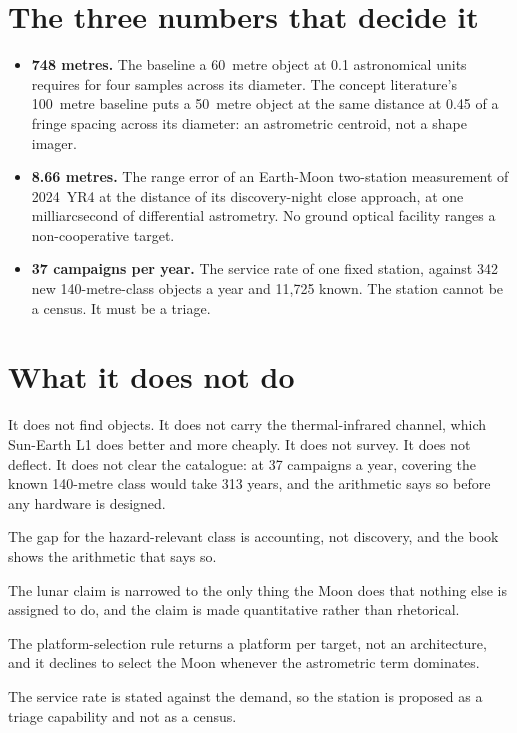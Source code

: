 \section*{The three numbers that decide it}

\begin{itemize}
\item \textbf{748 metres.} The baseline a 60~metre object at 0.1 astronomical
units requires for four samples across its diameter. The concept literature's
100~metre baseline puts a 50~metre object at the same distance at 0.45 of a
fringe spacing across its diameter: an astrometric centroid, not a shape
imager.
\item \textbf{8.66 metres.} The range error of an Earth-Moon two-station
measurement of 2024~YR4 at the distance of its discovery-night close approach,
at one milliarcsecond of differential astrometry. No ground optical facility
ranges a non-cooperative target.
\item \textbf{37 campaigns per year.} The service rate of one fixed station,
against 342 new 140-metre-class objects a year and 11,725 known. The station
cannot be a census. It must be a triage.
\end{itemize}

\section*{What it does not do}

It does not find objects. It does not carry the thermal-infrared channel,
which Sun-Earth L1 does better and more cheaply. It does not survey. It does
not deflect. It does not clear the catalogue: at 37 campaigns a year, covering
the known 140-metre class would take 313 years, and the arithmetic says so
before any hardware is designed.

\begin{keytakeaways}
\item The gap for the hazard-relevant class is accounting, not discovery, and
the book shows the arithmetic that says so.
\item The lunar claim is narrowed to the only thing the Moon does that nothing
else is assigned to do, and the claim is made quantitative rather than
rhetorical.
\item The platform-selection rule returns a platform per target, not an
architecture, and it declines to select the Moon whenever the astrometric term
dominates.
\item The service rate is stated against the demand, so the station is
proposed as a triage capability and not as a census.
\end{keytakeaways}
\clearpage

